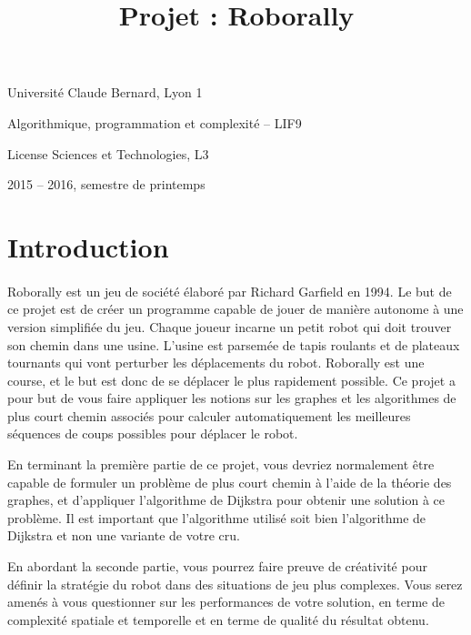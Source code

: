 \documentclass[a4paper]{article}
\title{Projet : Roborally}
\author{}
\date{}
\newcommand{\li}{\linewidth}
\begin{document}
\noindent
\begin{minipage}{0.5\li}
  Université Claude Bernard, Lyon 1

  Algorithmique, programmation et complexité -- LIF9
\end{minipage}
\hfill
\begin{minipage}{0.4\li}
  \raggedright
  License Sciences et Technologies, L3

  2015 -- 2016, semestre de printemps
\end{minipage}

{\let\newpage\relax\maketitle}

\section{Introduction}

\paragraph{}Roborally est un jeu de société élaboré par Richard Garfield en
1994. Le but de ce projet est de créer un programme capable de jouer de manière
autonome à une version simplifiée du jeu. Chaque joueur incarne un petit robot
qui doit trouver son chemin dans une usine. L'usine est parsemée de tapis
roulants et de plateaux tournants qui vont perturber les déplacements du robot.
Roborally est une course, et le but est donc de se déplacer le plus rapidement
possible. Ce projet a pour but de vous faire appliquer les notions sur les
graphes et les algorithmes de plus court chemin associés pour calculer
automatiquement les meilleures séquences de coups possibles pour déplacer le
robot.

En terminant la première partie de ce projet, vous devriez normalement être
capable de formuler un problème de plus court chemin à l'aide de la théorie des
graphes, et d'appliquer l'algorithme de Dijkstra pour obtenir une solution à ce
problème. Il est important que l'algorithme utilisé soit bien l'algorithme de
Dijkstra et non une variante de votre cru.

En abordant la seconde partie, vous pourrez faire preuve de créativité pour
définir la stratégie du robot dans des situations de jeu plus complexes. Vous
serez amenés à vous questionner sur les performances de votre solution, en terme
de complexité spatiale et temporelle et en terme de qualité du résultat obtenu.
\end{document}

